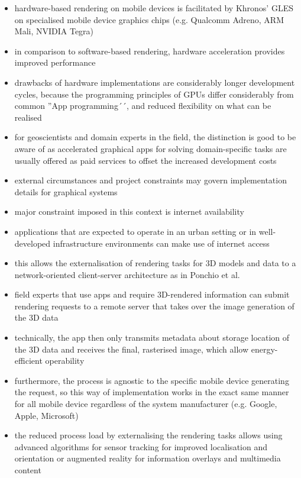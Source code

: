 \documentclass[review]{elsarticle}
\begin{document}
\begin{itemize}
\item hardware-based rendering on mobile devices is facilitated by Khronos' \gls{GLES} \cite{} on specialised mobile device graphics chips (e.g. Qualcomm Adreno, ARM Mali, NVIDIA Tegra)
\item in comparison to software-based rendering, hardware acceleration provides improved performance
\item drawbacks of hardware implementations are considerably longer development cycles, because the programming principles of GPUs differ considerably from common ''App programming´´, and reduced flexibility on what can be realised
\item for geoscientists and domain experts in the field, the distinction is good to be aware of as accelerated graphical apps for solving domain-specific tasks are usually offered as paid services to offset the increased development costs
\item external circumstances and project constraints may govern implementation details for graphical systems
\item major constraint imposed in this context is internet availability
\item applications that are expected to operate in an urban setting or in well-developed infrastructure environments can make use of internet access
\item this allows the externalisation of rendering tasks for 3D models and data to a network-oriented client-server architecture as in Ponchio et al. \cite{Ponchio2016}
\item field experts that use apps and require 3D-rendered information can submit rendering requests to a remote server that takes over the image generation of the 3D data
\item technically, the app then only transmits metadata about storage location of the 3D data and receives the final, rasterised image, which allow energy-efficient operability 
\item furthermore, the process is agnostic to the specific mobile device generating the request, so this way of implementation works in the exact same manner for all mobile device regardless of the system manufacturer (e.g. Google, Apple, Microsoft)
\item the reduced process load by externalising the rendering tasks allows using advanced algorithms for sensor tracking \cite{} for improved localisation and orientation or augmented reality \cite{} for information overlays and multimedia content

\end{itemize}
\end{document}
